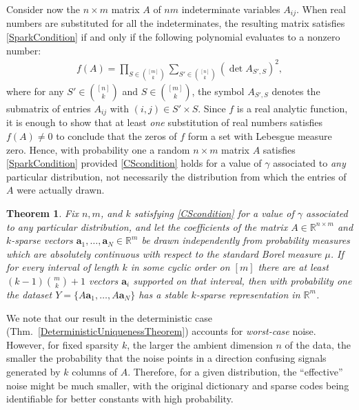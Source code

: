 \documentclass[journal, twocolumn]{IEEEtran}
\newtheorem{theorem}{Theorem}
\begin{document}
Consider now the $n \times m$ matrix $A$ of $nm$ indeterminate variables $A_{ij}$. When real numbers are substituted for all the indeterminates, the resulting matrix satisfies \eqref{SparkCondition} if and only if the following polynomial evaluates to a nonzero number:
\begin{align*}
f(A) = \prod_{S \in {[m] \choose k}} \sum_{S' \in {[n] \choose k}} (\det A_{S',S})^2,
\end{align*}
%
where for any $S' \in {[n] \choose k}$ and $S \in {[m] \choose k}$, the symbol $A_{S',S}$ denotes the submatrix of entries $A_{ij}$ with $(i,j) \in S' \times S$. Since $f$ is a real analytic function, it is enough to show that at least \emph{one} substitution of real numbers satisfies $f(A) \neq 0$ to conclude that the zeros of $f$ form a set with Lebesgue measure zero. Hence, with probability one a random $n \times m$ matrix $A$ satisfies \eqref{SparkCondition} provided \eqref{CScondition} holds for a value of $\gamma$ associated to \emph{any} particular distribution, not necessarily the distribution from which the entries of $A$ were actually drawn. 
 
\begin{theorem}\label{ProbabilisticTheorem}
Fix $n, m$, and $k$ satisfying \eqref{CScondition} for a value of $\gamma$ associated to any particular distribution, and let the coefficients of the matrix $A \in \mathbb{R}^{n \times m}$ and $k$-sparse vectors $\mathbf{a}_1, \ldots, \mathbf{a}_N \in \mathbb{R}^m$ be drawn independently from probability measures which are absolutely continuous with respect to the standard Borel measure $\mu$. If for every interval of length $k$ in some cyclic order on $[m]$ there are at least $(k-1){m \choose k} + 1$ vectors $\mathbf{a}_i$ supported on that interval, then with probability one the dataset $Y = \{A\mathbf{a}_1, \ldots, A\mathbf{a}_N\}$ has a stable $k$-sparse representation in $\mathbb{R}^m$.
\end{theorem}

We note that our result in the deterministic case (Thm.~\ref{DeterministicUniquenessTheorem}) accounts for \emph{worst-case} noise.  However, for fixed sparsity $k$, the larger the ambient dimension $n$ of the data, the smaller the probability that the noise points in a direction  confusing signals generated by $k$ columns of $A$.  Therefore, for a given distribution, the ``effective'' noise might be much smaller, with the original dictionary and sparse codes being identifiable for better constants with high probability. 
\end{document}
